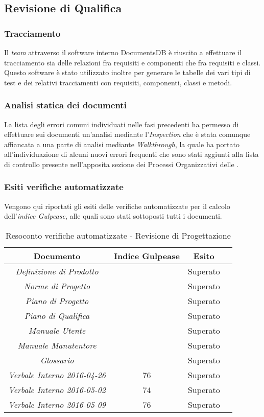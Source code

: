 \subsection{Revisione di Qualifica}

\subsubsection{Tracciamento}
Il \textit{team} attraverso il software interno DocumentsDB è riuscito a effettuare il tracciamento sia delle relazioni fra requisiti e componenti che fra requisiti e classi. Questo software è stato utilizzato inoltre per generare le tabelle dei vari tipi di test e dei relativi tracciamenti con requisiti, componenti, classi e metodi.

\subsubsection{Analisi statica dei documenti}
La lista degli errori comuni individuati nelle fasi precedenti ha permesso di effettuare sui documenti un'analisi mediante l'\textit{Inspection} che è stata comunque affiancata a una parte di analisi mediante \textit{Walkthrough}, la quale ha portato all'individuazione di alcuni nuovi errori frequenti che sono stati aggiunti alla lista di controllo presente nell'apposita sezione dei Processi Organizzativi delle \textit{\NdP}.

\subsubsection{Esiti verifiche automatizzate}
Vengono qui riportati gli esiti delle verifiche automatizzate per il calcolo dell'\textit{indice Gulpease}, alle quali sono stati sottoposti tutti i documenti.
\begin{table}[h]
\begin{center}
\begin{tabular}{|c|c|c|c|}
\hline \textbf{Documento} & \textbf{Indice Gulpease} & \textbf{Esito}\\
\hline
\emph{Definizione di Prodotto} &  & Superato \\
\emph{Norme di Progetto} &  & Superato \\
\emph{Piano di Progetto} &  & Superato \\
\emph{Piano di Qualifica} &  & Superato \\
\emph{Manuale Utente} &  & Superato \\
\emph{Manuale Manutentore} &  & Superato \\
\emph{Glossario} &  & Superato \\
\emph{Verbale Interno 2016-04-26} & 76 & Superato \\
\emph{Verbale Interno 2016-05-02} & 74 & Superato \\
\emph{Verbale Interno 2016-05-09} & 76 & Superato \\
\hline
\end{tabular}
\caption{Resoconto verifiche automatizzate - Revisione di Progettazione}
\end{center}
\end{table}

